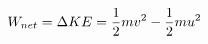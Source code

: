 \documentclass[preview]{standalone}
\begin{document}
\begin{align*}
\special{dvisvgm:raw <g id='unique000'>}W_{net} = \Delta KE = \frac{1}{2}mv^2 - \frac{1}{2}mu^2\special{dvisvgm:raw </g>}
\end{align*}
\end{document}
